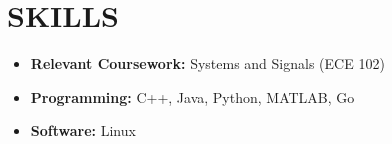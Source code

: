 \documentclass[letterpaper,9pt]{extarticle}
\begin{document}
\section*{SKILLS}
\begin{itemize}
	\item \textbf{Relevant Coursework:} Systems and Signals (ECE 102)
	\item \textbf{Programming:} C++, Java, Python, MATLAB, Go
	\item \textbf{Software:} Linux
\end{itemize}

\end{document}
